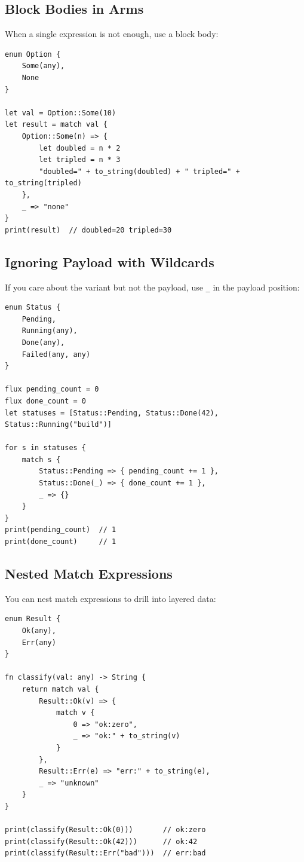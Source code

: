 \subsection{Block Bodies in Arms}

When a single expression is not enough, use a block body:

\begin{lstlisting}[language=Lattice, caption={Block bodies in match arms}]
enum Option {
    Some(any),
    None
}

let val = Option::Some(10)
let result = match val {
    Option::Some(n) => {
        let doubled = n * 2
        let tripled = n * 3
        "doubled=" + to_string(doubled) + " tripled=" + to_string(tripled)
    },
    _ => "none"
}
print(result)  // doubled=20 tripled=30
\end{lstlisting}

\subsection{Ignoring Payload with Wildcards}

If you care about the variant but not the payload, use \lstinline|_| in the
payload position:

\begin{lstlisting}[language=Lattice, caption={Ignoring payloads with wildcards}]
enum Status {
    Pending,
    Running(any),
    Done(any),
    Failed(any, any)
}

flux pending_count = 0
flux done_count = 0
let statuses = [Status::Pending, Status::Done(42), Status::Running("build")]

for s in statuses {
    match s {
        Status::Pending => { pending_count += 1 },
        Status::Done(_) => { done_count += 1 },
        _ => {}
    }
}
print(pending_count)  // 1
print(done_count)     // 1
\end{lstlisting}

\subsection{Nested Match Expressions}

You can nest match expressions to drill into layered data:

\begin{lstlisting}[language=Lattice, caption={Nested match on enums}]
enum Result {
    Ok(any),
    Err(any)
}

fn classify(val: any) -> String {
    return match val {
        Result::Ok(v) => {
            match v {
                0 => "ok:zero",
                _ => "ok:" + to_string(v)
            }
        },
        Result::Err(e) => "err:" + to_string(e),
        _ => "unknown"
    }
}

print(classify(Result::Ok(0)))       // ok:zero
print(classify(Result::Ok(42)))      // ok:42
print(classify(Result::Err("bad")))  // err:bad
\end{lstlisting}

